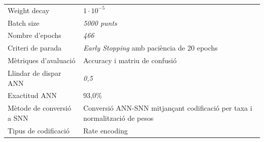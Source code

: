 \documentclass[a4paper,11pt, titlepage, twoside]{article}
\begin{document}
\begin{appendices}
\begin{table}[H]
\begin{tabular}{p{4.2cm} p{8.5cm}}
			Weight decay
			                   & $1 \cdot 10^{-5}$                                                                                                                                                   \\

			Batch size
			                   & \textit{5000 punts}                                                                                                                                                 \\

			Nombre d'epochs
			                   & \textit{466}                                                                                                                                                        \\

			Criteri de parada
			                   & \textit{Early Stopping} amb paciència de 20 epochs                                                                                                                  \\

			Mètriques d'avaluació
			                   & Accuracy i matriu de confusió                                                                                                                                       \\

			Llindar de dispar ANN
			                   & \textit{0,5}                                                                                                                                                        \\

			Exactitud ANN
			                   & 93,0\%                                                                                                                                                              \\

			Mètode de conversió a SNN
			                   & Conversió ANN-SNN mitjançant codificació per taxa i normalització de pesos                                                                                          \\

			Tipus de codificació
			                   & Rate encoding                                                                                                                                                       \\


\end{tabular}
\end{table}
\end{appendices}
\end{document}
